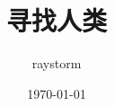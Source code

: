 \documentclass[a4paper,UTF8]{ctexbook}
\begin{document}


\title{寻找人类}
\author{raystorm}
\date{\today}
\maketitle

\setcounter{tocdepth}{1}
\tableofcontents



\end{document}
